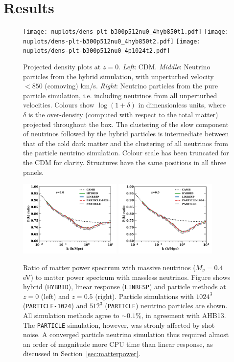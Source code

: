 \documentclass[useAMS, usenatbib]{mnras}
\begin{document}
\section{Results}
\label{sec:results}

\begin{figure}
\texttt{[image: nuplots/dens-plt-b300p512nu0\_4hyb850t1.pdf]}
\texttt{[image: nuplots/dens-plt-b300p512nu0\_4hyb850t2.pdf]}
\texttt{[image: nuplots/dens-plt-b300p512nu0\_4p1024t2.pdf]}
    \caption{Projected density plots at $z=0$. \emph{Left}: CDM. \emph{Middle}: Neutrino particles from the hybrid simulation, with unperturbed velocity $<850$ (comoving) km/s. \emph{Right}: Neutrino particles from the pure particle simulation, i.e. including neutrinos from all unperturbed velocities. Colours show $\log (1+ \delta)$ in dimensionless units, where $\delta$ is the over-density (computed with respect to the total matter) projected throughout the box.
  The clustering of the slow component of neutrinos followed by the hybrid particles is intermediate between that of the cold dark matter and the clustering of all neutrinos from the particle neutrino simulation. Colour scale has been truncated for the CDM for clarity. Structures have the same positions in all three panels.
  }
  \label{fig:density_plot}
\end{figure}

\begin{figure}
\includegraphics[width=0.45\textwidth]{nuplots/pks_rel-10.pdf}
\includegraphics[width=0.45\textwidth]{nuplots/pks_rel-0_66670.pdf}
    \caption{Ratio of matter power spectrum with massive neutrinos ($M_\nu = 0.4$ eV) to matter power spectrum with massless neutrinos. Figure shows hybrid (\texttt{HYBRID}), linear response (\texttt{LINRESP}) and particle methods at $z=0$ (left) and $z=0.5$ (right). Particle simulations with $1024^3$ (\texttt{PARTICLE-1024}) and $512^3$ (\texttt{PARTICLE}) neutrino particles are shown. All simulation methods agree to $\sim 0.1$\%, in agreement with AHB13. The \texttt{PARTICLE} simulation, however, was stronly affected by shot noise. A converged particle neutrino simulation thus required almost an order of magnitude more CPU time than linear response, as discussed in Section~\ref{sec:matterpower}.}
  \label{fig:matter_power}
\end{figure}
\end{document}
